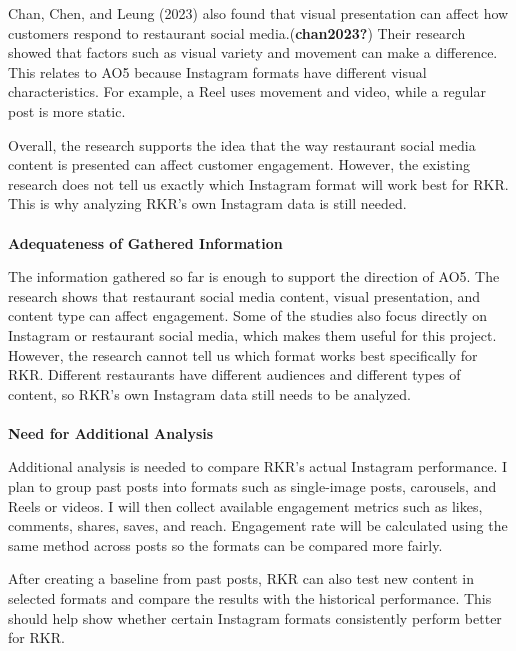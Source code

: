 \documentclass[
  12pt,
  letterpaper,
  DIV=11,
  numbers=noendperiod]{scrartcl}
\makeatletter
\let\oldparagraph\paragraph
\renewcommand{\paragraph}{
    \@ifstar
      \xxxParagraphStar
      \xxxParagraphNoStar
  }
\newcommand{\xxxParagraphStar}[1]{\oldparagraph*{#1}\mbox{}}
\newcommand{\xxxParagraphNoStar}[1]{\oldparagraph{#1}\mbox{}}
\makeatother
\begin{document}
Chan, Chen, and Leung (2023) also found that visual presentation can
affect how customers respond to restaurant social
media.(\textbf{chan2023?}) Their research showed that factors such as
visual variety and movement can make a difference. This relates to AO5
because Instagram formats have different visual characteristics. For
example, a Reel uses movement and video, while a regular post is more
static.

Overall, the research supports the idea that the way restaurant social
media content is presented can affect customer engagement. However, the
existing research does not tell us exactly which Instagram format will
work best for RKR. This is why analyzing RKR's own Instagram data is
still needed.

\paragraph{\texorpdfstring{\textbf{Adequateness of Gathered
Information}}{Adequateness of Gathered Information}}\label{adequateness-of-gathered-information-4}

The information gathered so far is enough to support the direction of
AO5. The research shows that restaurant social media content, visual
presentation, and content type can affect engagement. Some of the
studies also focus directly on Instagram or restaurant social media,
which makes them useful for this project. However, the research cannot
tell us which format works best specifically for RKR. Different
restaurants have different audiences and different types of content, so
RKR's own Instagram data still needs to be analyzed.

\paragraph{\texorpdfstring{\textbf{Need for Additional
Analysis}}{Need for Additional Analysis}}\label{need-for-additional-analysis-4}

Additional analysis is needed to compare RKR's actual Instagram
performance. I plan to group past posts into formats such as
single-image posts, carousels, and Reels or videos. I will then collect
available engagement metrics such as likes, comments, shares, saves, and
reach. Engagement rate will be calculated using the same method across
posts so the formats can be compared more fairly.

After creating a baseline from past posts, RKR can also test new content
in selected formats and compare the results with the historical
performance. This should help show whether certain Instagram formats
consistently perform better for RKR.
\end{document}

